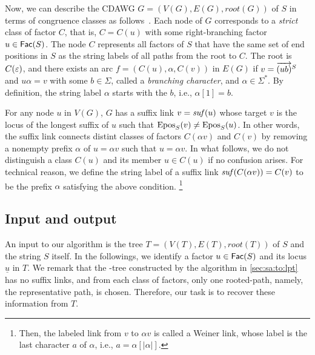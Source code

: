 Now, we can describe the CDAWG $G = (V(G), E(G), root(G))$ of $S$ in terms of congruence classes as follows~\cite{crochemore:verin1997direct}.  
Each node of $G$ corresponds to a \textit{strict} class of factor $C$, that is,  $C = C(u)$ with some right-branching factor $u \in \mathsf{Fac}{(S)}$. The node $C$ represents all factors of $S$ that have the same set of end positions in $S$ as the string labels of all paths from the root to $C$. The root is $C(\varepsilon)$, and there exists an arc $f = (C(u), \alpha, C(v))$ in $E(G)$ if $v = \overrightarrow{(ub)}^{S}$ and $u\alpha = v$ with some $b \in \Sigma$, called a \textit{branching character}, and $\alpha \in \Sigma^*$. By definition, the string label $\alpha$ starts with the  $b$, i.e., $\alpha[1] = b$.  

For any node $u$ in $V(G)$, $G$ has a suffix link $v = \mathit{suf}(u)$ whose target $v$ is the locus of the longest suffix of $u$ such that $\mathrm{Epos}_{S}(v) \not= \mathrm{Epos}_{S}(u)$. In other words, the suffix link connects distint classes of factors $C(\alpha v)$ and $C(v)$ by removing a nonempty prefix $\alpha$ of $u = \alpha v$ such that $u = \alpha v$. In what follows, we do not distinguish a class $C(u)$ and its member $u \in C(u)$ if no confusion arises.
For technical reason, we define the string label of a suffix link $\mathit{suf}(C(\alpha v)) = C(v)$ to be the prefix $\alpha$ satisfying the above condition.%
\footnote{
Then, the labeled link from $v$ to $\alpha v$ is called a Weiner link, whose label is the last character $a$ of $\alpha$, i.e., $a = \alpha[|\alpha|]$. 
}



\subsection{Input and output}

An input to our algorithm is the \LPTrm tree $T = (V(T), E(T), root(T))$ of $S$ and the string $S$ itself. In the followings, we identify a factor $u\in \mathsf{Fac}{(S)}$ and its locus $\underline{u}$ in $T$. We remark that the \LPTrm-tree constructed by the algorithm in \cref{sec:sa:to:lpt} has no suffix links, and from each class of factors, only one rooted-path, namely, the representative path, is chosen. Therefore, our task is to recover these information from $T$. 

